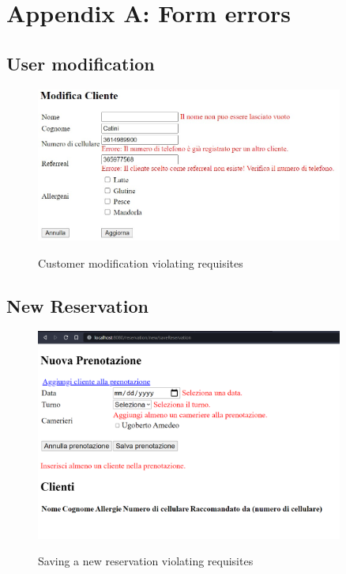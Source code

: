 \documentclass{article}
\begin{document}
\newpage
\section*{Appendix A: Form errors}

\vspace*{5mm}

\subsection*{User modification}
\begin{figure}[H]
    \centering
    \includegraphics[width=0.9\textwidth]{images/customer_validation_error.jpg}
    \label{fig:customer_validation_error}
    \caption{Customer modification violating requisites}
\end{figure}

\vspace*{5mm}

\subsection*{New Reservation}
\label{sec:new_reservation_form_errors}
\begin{figure}[H]
    \centering
    \includegraphics[width=0.9\textwidth]{images/new_reservation_form_errors}
    \label{fig:new_reservation_form_errors}
    \caption{Saving a new reservation violating requisites}
\end{figure}
\end{document}
